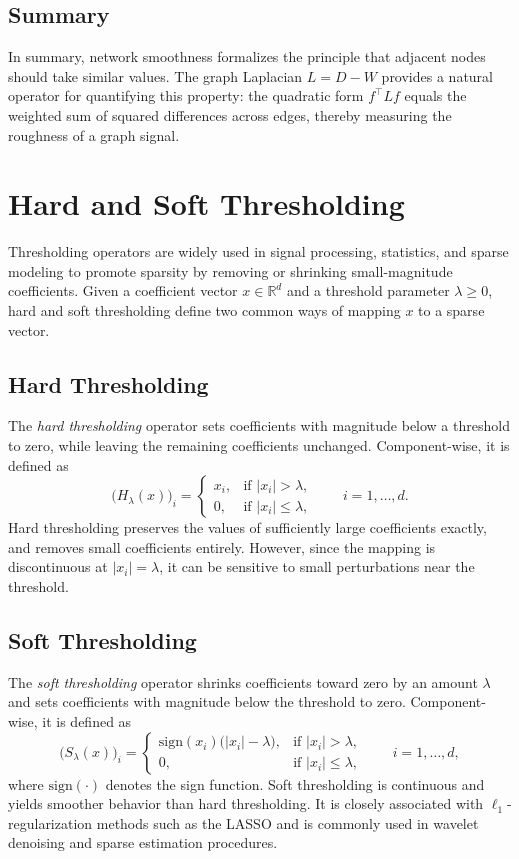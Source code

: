 \documentclass[11pt]{article}
\begin{document}
\subsection{Summary}
In summary, network smoothness formalizes the principle that adjacent nodes should take similar values. The graph Laplacian \(L=D-W\) provides a natural operator for quantifying this property: the quadratic form \(f^\top L f\) equals the weighted sum of squared differences across edges, thereby measuring the roughness of a graph signal.

\section{Hard and Soft Thresholding}

Thresholding operators are widely used in signal processing, statistics, and sparse modeling to promote sparsity by removing or shrinking small-magnitude coefficients. Given a coefficient vector $x \in \mathbb{R}^d$ and a threshold parameter $\lambda \ge 0$, hard and soft thresholding define two common ways of mapping $x$ to a sparse vector.

\subsection{Hard Thresholding}

The \emph{hard thresholding} operator sets coefficients with magnitude below a threshold to zero, while leaving the remaining coefficients unchanged. Component-wise, it is defined as
\[
\bigl(H_\lambda(x)\bigr)_i
=
\begin{cases}
x_i, & \text{if } |x_i| > \lambda,\\
0, & \text{if } |x_i| \le \lambda,
\end{cases}
\qquad i=1,\dots,d.
\]
Hard thresholding preserves the values of sufficiently large coefficients exactly, and removes small coefficients entirely. However, since the mapping is discontinuous at $|x_i|=\lambda$, it can be sensitive to small perturbations near the threshold.

\subsection{Soft Thresholding}

The \emph{soft thresholding} operator shrinks coefficients toward zero by an amount $\lambda$ and sets coefficients with magnitude below the threshold to zero. Component-wise, it is defined as
\[
\bigl(S_\lambda(x)\bigr)_i
=
\begin{cases}
\mathrm{sign}(x_i)\bigl(|x_i|-\lambda\bigr), & \text{if } |x_i| > \lambda,\\
0, & \text{if } |x_i| \le \lambda,
\end{cases}
\qquad i=1,\dots,d,
\]
where $\mathrm{sign}(\cdot)$ denotes the sign function. Soft thresholding is continuous and yields smoother behavior than hard thresholding. It is closely associated with $\ell_1$-regularization methods such as the LASSO and is commonly used in wavelet denoising and sparse estimation procedures.
\end{document}
